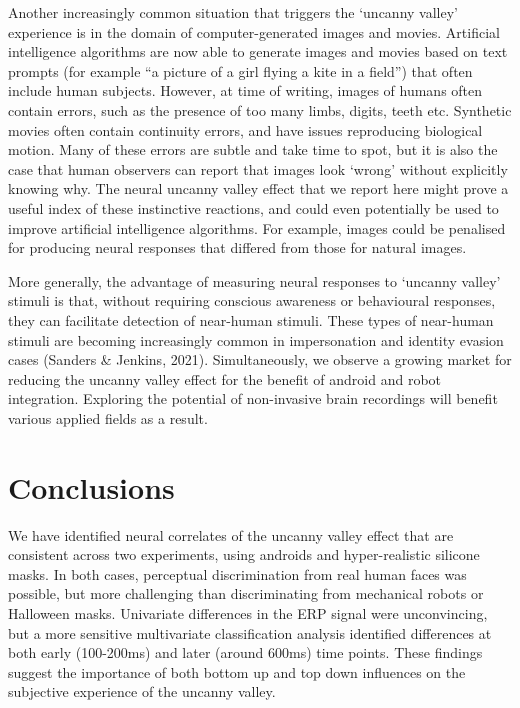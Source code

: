 \documentclass[
]{article}
\begin{document}
Another increasingly common situation that triggers the `uncanny valley' experience is in the domain of computer-generated images and movies. Artificial intelligence algorithms are now able to generate images and movies based on text prompts (for example ``a picture of a girl flying a kite in a field'') that often include human subjects. However, at time of writing, images of humans often contain errors, such as the presence of too many limbs, digits, teeth etc. Synthetic movies often contain continuity errors, and have issues reproducing biological motion. Many of these errors are subtle and take time to spot, but it is also the case that human observers can report that images look `wrong' without explicitly knowing why. The neural uncanny valley effect that we report here might prove a useful index of these instinctive reactions, and could even potentially be used to improve artificial intelligence algorithms. For example, images could be penalised for producing neural responses that differed from those for natural images.

More generally, the advantage of measuring neural responses to `uncanny valley' stimuli is that, without requiring conscious awareness or behavioural responses, they can facilitate detection of near-human stimuli. These types of near-human stimuli are becoming increasingly common in impersonation and identity evasion cases (Sanders \& Jenkins, 2021). Simultaneously, we observe a growing market for reducing the uncanny valley effect for the benefit of android and robot integration. Exploring the potential of non-invasive brain recordings will benefit various applied fields as a result.

\section{Conclusions}\label{conclusions}

We have identified neural correlates of the uncanny valley effect that are consistent across two experiments, using androids and hyper-realistic silicone masks. In both cases, perceptual discrimination from real human faces was possible, but more challenging than discriminating from mechanical robots or Halloween masks. Univariate differences in the ERP signal were unconvincing, but a more sensitive multivariate classification analysis identified differences at both early (100-200ms) and later (around 600ms) time points. These findings suggest the importance of both bottom up and top down influences on the subjective experience of the uncanny valley.
\end{document}
